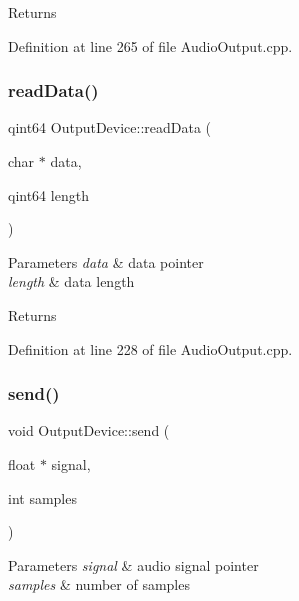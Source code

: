 \begin{DoxyReturn}{Returns}

\end{DoxyReturn}


Definition at line 265 of file Audio\+Output.\+cpp.

\mbox{\label{class_output_device_a5f455a9fdaa26664957b54b7806a1b7d}} 
\subsubsection{\texorpdfstring{read\+Data()}{readData()}}
{\footnotesize\ttfamily qint64 Output\+Device\+::read\+Data (\begin{DoxyParamCaption}\item[{char $\ast$}]{data,  }\item[{qint64}]{length }\end{DoxyParamCaption})}


\begin{DoxyParams}{Parameters}
{\em data} & data pointer \\
\hline
{\em length} & data length \\
\hline
\end{DoxyParams}
\begin{DoxyReturn}{Returns}

\end{DoxyReturn}


Definition at line 228 of file Audio\+Output.\+cpp.

\mbox{\label{class_output_device_aa4906f742ed51716dfc9a7602014efcc}} 
\subsubsection{\texorpdfstring{send()}{send()}}
{\footnotesize\ttfamily void Output\+Device\+::send (\begin{DoxyParamCaption}\item[{float $\ast$}]{signal,  }\item[{int}]{samples }\end{DoxyParamCaption})}


\begin{DoxyParams}{Parameters}
{\em signal} & audio signal pointer \\
\hline
{\em samples} & number of samples \\
\hline
\end{DoxyParams}


